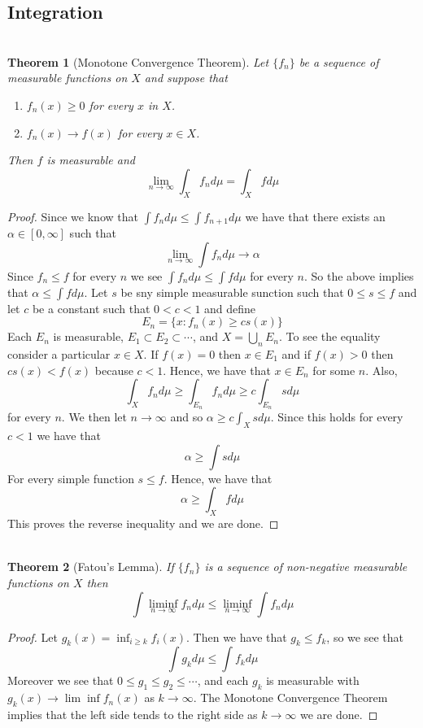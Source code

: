 \documentclass{article}
\DeclareMathOperator{\suchthat}{\mathrel{:}}
\newtheorem*{thm}{\\ Theorem}
\begin{document}
\subsection{Integration}
\begin{thm}[Monotone Convergence Theorem]
  Let $\{f_n\}$ be a sequence of measurable functions on $X$ and suppose that
  \begin{enumerate}
  \item $f_n(x) \geq 0$ for every $x$ in $X$.
  \item $f_n(x) \to f(x)$ for every $x \in X$.
  \end{enumerate}
  Then $f$ is measurable and
  \[
  \lim_{n\to \infty} \int_X f_n d\mu = \int_X f d\mu
  \]
\end{thm}
\begin{proof}
  Since we know that $\int f_n d\mu \leq \int f_{n+1} d\mu$ we have that
  there exists an $\alpha \in [0, \infty]$ such that
  \[
  \lim_{n\to\infty}\int f_n d\mu \to \alpha
  \]
  Since $f_n \leq f$ for every $n$ we see $\int f_nd\mu \leq \int fd\mu$ for
  every $n$. So the above implies that $\alpha \leq \int f d\mu$. Let $s$ be
  sny simple measurable sunction such that $0 \leq s \leq f$ and let $c$ be
  a constant such that $ 0 < c < 1$ and define
  \[
  E_n = \{x \suchthat f_n(x) \geq cs(x)\}
  \]
  Each $E_n$ is measurable, $E_1 \subset E_2 \subset \cdots$, and $X =
  \bigcup_n E_n$. To see the equality consider a particular $x \in X$. If
  $f(x) = 0$ then $x \in E_1$ and if $f(x) > 0$ then $cs(x) < f(x)$ because
  $c < 1$. Hence, we have that $x \in E_n$ for some $n$. Also,
  \[
  \int_X f_n d\mu \geq \int_{E_n} f_n d\mu \geq c\int_{E_n} s d\mu
  \]
  for every $n$. We then let $n \to \infty$ and so $\alpha \geq c \int_X
  sd\mu$. Since this holds for every $c < 1$ we have that
  \[
  \alpha \geq \int s d\mu
  \]
  For every simple function $s \leq f$. Hence, we have that
  \[
  \alpha \geq \int_X fd\mu
  \]
  This proves the reverse inequality and we are done.
\end{proof}

\begin{thm}[Fatou's Lemma]
  If $\{f_n\}$ is a sequence of non-negative measurable functions on $X$ then
  \[
  \int \liminf_{n\to\infty} f_n d\mu \leq \liminf_{n\to\infty} \int f_n d\mu
  \]
\end{thm}
\begin{proof}
  Let $g_k(x) = \inf_{i \geq k} f_i(x)$. Then we have that $g_k \leq f_k$, so
  we see that
  \[
  \int g_kd\mu \leq \int f_k d\mu
  \]
  Moreover we see that $0 \leq g_1 \leq g_2 \leq \cdots $, and each $g_k$ is
  measurable with $g_k(x) \to \lim\inf f_n(x)$ as $k \to \infty$. The
  Monotone Convergence Theorem implies that the left side tends to the right
  side as $k \to \infty$ we are done.
\end{proof}
\end{document}
